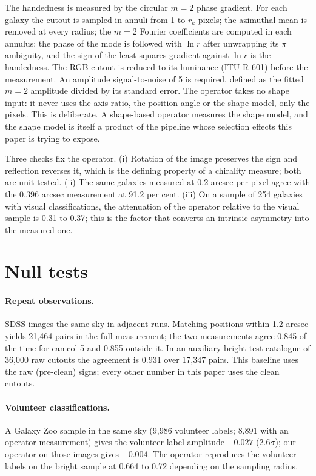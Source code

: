 \documentclass[11pt]{article}
\begin{document}
The handedness is measured by the circular $m=2$ phase gradient. For each galaxy the cutout is
sampled in annuli from 1 to $r_k$ pixels; the azimuthal mean is removed at every radius; the $m=2$
Fourier coefficients are computed in each annulus; the phase of the mode is followed with $\ln r$
after unwrapping its $\pi$ ambiguity, and the sign of the least-squares gradient against $\ln r$ is
the handedness. The RGB cutout is reduced to its luminance (ITU-R 601) before the measurement. An
amplitude signal-to-noise of 5 is required, defined as the fitted $m=2$ amplitude divided by its
standard error. The operator takes no shape input: it never uses the axis ratio, the position angle or
the shape model, only the pixels. This is deliberate. A shape-based operator measures the shape
model, and the shape model is itself a product of the pipeline whose selection effects this paper
is trying to expose.

Three checks fix the operator. (i) Rotation of the image preserves the sign and reflection reverses
it, which is the defining property of a chirality measure; both are unit-tested. (ii) The same
galaxies measured at 0.2 arcsec per pixel agree with the 0.396 arcsec measurement at 91.2 per cent.
(iii) On a sample of 254 galaxies with visual classifications, the attenuation of the operator
relative to the visual sample is 0.31 to 0.37; this is the factor that converts an intrinsic
asymmetry into the measured one.

\section{Null tests}

\paragraph{Repeat observations.} SDSS images the same sky in adjacent runs. Matching positions
within 1.2 arcsec yields 21,464 pairs in the full measurement; the two measurements agree 0.845 of
the time for camcol 5 and 0.855 outside it. In an auxiliary bright test catalogue of 36,000 raw cutouts the agreement is 0.931 over
17,347 pairs. This baseline uses the raw (pre-clean) signs; every other number in this paper uses
the clean cutouts.

\paragraph{Volunteer classifications.} A Galaxy Zoo sample in the same sky \cite{lintott2008, masters2021} (9,986 volunteer labels; 8,891 with an operator measurement) gives the volunteer-label amplitude $-0.027$ ($2.6\sigma$); our operator on those images gives $-0.004$. The
operator reproduces the volunteer labels on the bright sample at 0.664 to 0.72 depending on the
sampling radius.
\end{document}
